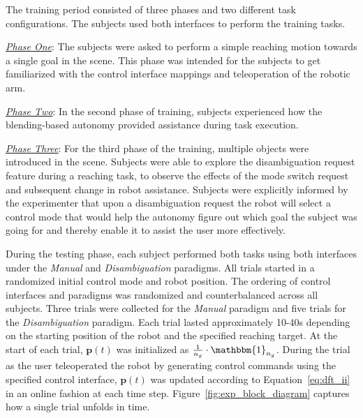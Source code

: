 \documentclass[journal]{IEEEtran}
\begin{document}
The training period consisted of three phases and two different task configurations. The subjects used both interfaces to perform the training tasks.

\underline{\textit{Phase One}}: The subjects were asked to perform a simple reaching motion towards a single goal in the scene. This phase was intended for the subjects to get familiarized with the control interface mappings and teleoperation of the robotic arm.

\underline{\textit{Phase Two}}: In the second phase of training, subjects experienced how the blending-based autonomy provided assistance during task execution. 

\underline{\textit{Phase Three}}: For the third phase of the training, multiple objects were introduced in the scene. Subjects were able to explore the disambiguation request feature during a reaching task, to observe the effects of the mode switch request and subsequent change in robot assistance. 
Subjects were explicitly informed by the experimenter that upon a disambiguation request the robot will select a control mode that would help the autonomy figure out which goal the subject was going for and thereby enable it to assist the user more effectively.


During the testing phase, each subject performed both tasks using both interfaces under the \textit{Manual} and \textit{Disambiguation} paradigms. All trials started in a randomized initial control mode and robot position. The ordering of control interfaces and paradigms was randomized and counterbalanced across all subjects. Three trials were collected for the \textit{Manual} paradigm and five trials for the \textit{Disambiguation} paradigm. Each trial lasted approximately 10-40s depending on the starting position of the robot and the specified reaching target. At the start of each trial, $\boldsymbol{p}(t)$ was initialized as $\frac{1}{n_g}\cdot\mathbbm{1}_{n_g}$. During the trial as the user teleoperated the robot by generating control commands using the specified control interface, $\boldsymbol{p}(t)$ was updated according to Equation~\ref{eq:dft_ii} in an online fashion at each time step. Figure~\ref{fig:exp_block_diagram} captures how a single trial unfolds in time.
\end{document}
